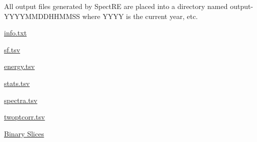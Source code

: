 All output files generated by SpectRE are placed into a directory named output-\/YYYYMMDDHHMMSS where YYYY is the current year, etc.

\begin{DoxyItemize}
\item \hyperlink{info__txt}{info.txt} \item \hyperlink{sf__tsv}{sf.tsv} \item \hyperlink{energy__tsv}{energy.tsv} \item \hyperlink{stats__tsv}{stats.tsv} \item \hyperlink{spectra__tsv}{spectra.tsv} \item \hyperlink{twoptcorr__tsv}{twoptcorr.tsv} \item \hyperlink{slices}{Binary Slices} \end{DoxyItemize}
